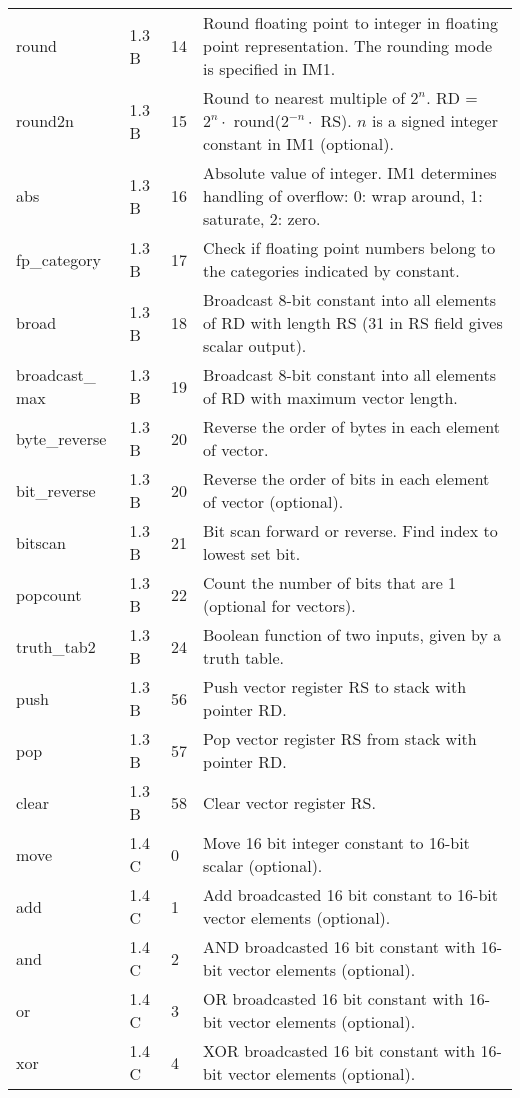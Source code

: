 \documentclass[forwardcom.tex]{subfiles}
\begin{document}
\begin{longtable} {|p{25mm}|p{14mm}|p{10mm}|p{95mm}|}
round         & 1.3 B & 14 & Round floating point to integer in floating point  representation. The rounding mode is specified in IM1. \\
round2n       & 1.3 B & 15 & Round to nearest multiple of $2^n$. \newline 
RD = $2^n\cdot$ round($2^{-n}\cdot$ RS). $n$ is a signed integer constant in IM1 (optional). \\
abs           & 1.3 B & 16 & Absolute value of integer. IM1 determines handling of overflow: 0: wrap around, 1: saturate, 2: zero. \\

fp\_category  & 1.3 B & 17 & Check if floating point numbers belong to the categories indicated by constant. \\

broad         & 1.3 B & 18 & Broadcast 8-bit constant into all elements of RD with length RS (31 in RS field gives scalar output). \\

broadcast\_ max & 1.3 B & 19 & Broadcast 8-bit constant into all elements of RD with maximum vector length. \\

byte\_reverse & 1.3 B & 20 & Reverse the order of bytes in each element of vector. \\
bit\_reverse  & 1.3 B & 20 & Reverse the order of bits in each element of vector (optional). \\

bitscan       & 1.3 B & 21 & Bit scan forward or reverse. Find index to lowest set bit. \\

popcount      & 1.3 B & 22 & Count the number of bits that are 1 (optional for vectors). \\
truth\_tab2   & 1.3 B & 24 & Boolean function of two inputs, given by a truth table. \\

push          & 1.3 B & 56  & Push vector register RS to stack with pointer RD. \\
pop           & 1.3 B & 57  & Pop vector register RS from stack with pointer RD. \\
clear         & 1.3 B & 58  & Clear vector register RS. \\

move          & 1.4 C &  0 & Move 16 bit integer constant to 16-bit scalar (optional). \\
add           & 1.4 C &  1 & Add broadcasted 16 bit constant to 16-bit vector elements (optional). \\
and           & 1.4 C &  2 & AND broadcasted 16 bit constant with 16-bit vector elements (optional). \\
or            & 1.4 C &  3 & OR broadcasted 16 bit constant with 16-bit vector elements (optional). \\
xor           & 1.4 C &  4 & XOR broadcasted 16 bit constant with 16-bit vector elements (optional). \\


\end{longtable}
\end{document}
